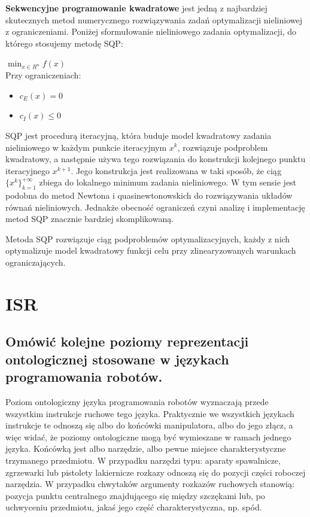 \textbf{Sekwencyjne programowanie kwadratowe} jest jedną z najbardziej skutecznych metod numerycznego rozwiązywania zadań optymalizacji nieliniowej z ograniczeniami. Poniżej sformułowanie nieliniowego zadania optymalizacji, do którego stosujemy metodę SQP:

$\min_{x\in R^n} f(x)$\\
Przy ograniczeniach:
\begin{itemize}
    \item $c_E(x) = 0$
    \item $c_I(x) \leq 0$
\end{itemize}

SQP jest procedurą iteracyjną, która buduje model kwadratowy zadania nieliniowego w każdym punkcie iteracyjnym $x^k$, rozwiązuje podproblem kwadratowy, a następnie używa tego rozwiązania do konstrukcji kolejnego punktu iteracyjnego $x^{k+1}$. Jego konstrukcja jest realizowana w taki sposób, że ciąg $\{x^k\}_{k=1}^{+\infty}$ zbiega do lokalnego minimum zadania nieliniowego. W tym sensie jest podobna do metod Newtona i quasinewtonowskich do rozwiązywania układów równań nieliniowych. Jednakże obecność ograniczeń czyni analizę i implementację metod SQP znacznie bardziej skomplikowaną.

Metoda SQP rozwiązuje ciąg podproblemów optymalizacyjnych, każdy z nich optymalizuje model kwadratowy funkcji celu przy zlinearyzowanych warunkach ograniczających.

\section{ISR}
\subsection{Omówić kolejne poziomy reprezentacji ontologicznej stosowane w językach programowania robotów.}
Poziom ontologiczny języka programowania robotów wyznaczają przede wszystkim instrukcje ruchowe tego języka. Praktycznie we wszystkich językach instrukcje te odnoszą się albo do końcówki manipulatora, albo do jego złącz, a więc widać, że poziomy ontologiczne mogą być wymieszane w ramach jednego języka. Końcówką jest albo narzędzie, albo pewne miejsce charakterystyczne trzymanego przedmiotu. W przypadku narzędzi typu: aparaty spawalnicze, zgrzewarki lub pistolety lakiernicze rozkazy odnoszą się do pozycji części roboczej narzędzia. W przypadku chwytaków argumenty rozkazów ruchowych stanowią: pozycja punktu centralnego znajdującego się między szczękami lub, po uchwyceniu przedmiotu, jakaś jego część charakterystyczna, np. spód.

